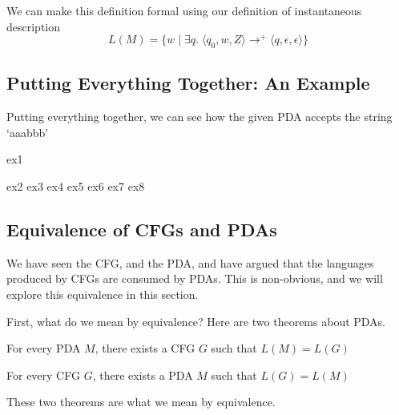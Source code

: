 We can make this definition formal using our definition of instantaneous description
\[L(M) = \{w \mid \exists q. \; \langle q_0, w, Z \rangle \rightarrow^{+} \langle q, \epsilon, \epsilon \rangle \} \]

\subsection{Putting Everything Together: An Example}
Putting everything together, we can see how the given PDA accepts the string `aaabbb' \vspace{3mm}

\begin{center}
    {ex1}\vspace{3mm}
\end{center}

\begin{center}
    {ex2}\vspace{3mm}
    {ex3}\vspace{3mm}
    {ex4}\vspace{3mm}
    {ex5}\vspace{3mm}
    {ex6}\vspace{3mm}
    {ex7}\vspace{3mm}
    {ex8}
\end{center}

\subsection{Equivalence of CFGs and PDAs}
We have seen the CFG, and the PDA, and have argued that the languages produced by CFGs are consumed by PDAs. This is non-obvious, and we will explore this equivalence in this section.

First, what do we mean by equivalence? Here are two theorems about PDAs.

\begin{theorem}
    For every PDA $M$, there exists a CFG $G$ such that $L(M) = L(G)$
\end{theorem}

\begin{theorem}
    For every CFG $G$, there exists a PDA $M$ such that $L(G) = L(M)$
\end{theorem}

These two theorems are what we mean by equivalence.

